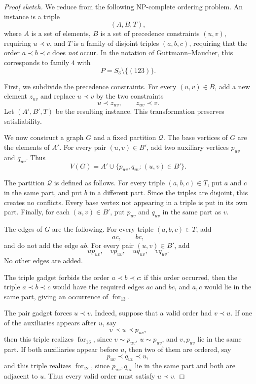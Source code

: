 \documentclass[12pt]{article}
\theoremstyle{plain}
\theoremstyle{definition}
\theoremstyle{remark}
\theoremstyle{definition}
\newcommand{\forlabel}{\mathrm{for}}
\DeclareRobustCommand{\forparam}[1]{%
  \ensuremath{\mathop{\forlabel}\nolimits_{#1}}%
}
\newcommand{\forrs}{\forparam{12}}
\newcommand{\forrt}{\forparam{13}}
\begin{document}
\begin{proof}[Proof sketch]
We reduce from the following NP-complete ordering problem. An instance is a triple
\[
(A,B,T),
\]
where \(A\) is a set of elements, \(B\) is a set of precedence constraints \((u,v)\), requiring
\(u\prec v\), and \(T\) is a family of disjoint triples \((a,b,c)\), requiring that the order
\(a\prec b\prec c\) does \emph{not} occur. In the notation of Guttmann--Maucher, this corresponds to family \(4\) with
\[
P=S_3\setminus\{(123)\}.
\]

First, we subdivide the precedence constraints. For every \((u,v)\in B\), add a new element \(z_{uv}\) and replace
\(u\prec v\) by the two constraints
\[
u\prec z_{uv},
\qquad
z_{uv}\prec v.
\]
Let \((A',B',T)\) be the resulting instance. This transformation preserves satisfiability.

We now construct a graph \(G\) and a fixed partition \(\mathcal Q\). The base vertices of \(G\) are the elements of
\(A'\). For every pair \((u,v)\in B'\), add two auxiliary vertices \(p_{uv}\) and \(q_{uv}\). Thus
\[
V(G)=A'\cup \{p_{uv},q_{uv}:(u,v)\in B'\}.
\]

The partition \(\mathcal Q\) is defined as follows. For every triple \((a,b,c)\in T\), put \(a\) and \(c\) in the
same part, and put \(b\) in a different part. Since the triples are disjoint, this creates no conflicts. Every base
vertex not appearing in a triple is put in its own part. Finally, for each \((u,v)\in B'\), put \(p_{uv}\) and
\(q_{uv}\) in the same part as \(v\).

The edges of \(G\) are the following. For every triple \((a,b,c)\in T\), add
\[
ac,\qquad bc,
\]
and do not add the edge \(ab\). For every pair \((u,v)\in B'\), add
\[
up_{uv},\quad vp_{uv},\quad uq_{uv},\quad vq_{uv}.
\]
No other edges are added.

The triple gadget forbids the order \(a\prec b\prec c\): if this order occurred, then the triple
\(a\prec b\prec c\) would have the required edges \(ac\) and \(bc\), and \(a,c\) would lie in the same part, giving an
occurrence of \(\forrt\).

The pair gadget forces \(u\prec v\). Indeed, suppose that a valid order had \(v\prec u\). If one of the auxiliaries
appears after \(u\), say
\[
v\prec u\prec p_{uv},
\]
then this triple realizes \(\forrt\), since \(v\sim p_{uv}\), \(u\sim p_{uv}\), and \(v,p_{uv}\) lie in the same part.
If both auxiliaries appear before \(u\), then two of them are ordered, say
\[
p_{uv}\prec q_{uv}\prec u,
\]
and this triple realizes \(\forrs\), since \(p_{uv},q_{uv}\) lie in the same part and both are adjacent to \(u\).
Thus every valid order must satisfy \(u\prec v\).


\end{proof}
\end{document}
